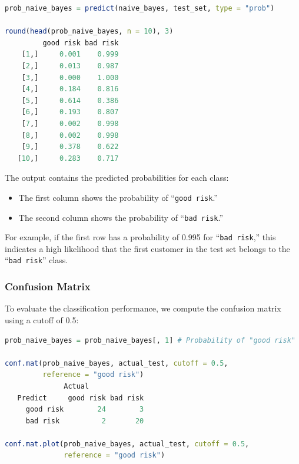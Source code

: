 \documentclass[
]{book}
\newcommand{\passthrough}[1]{#1}
\providecommand{\tightlist}{%
  \setlength{\itemsep}{0pt}\setlength{\parskip}{0pt}}
\theoremstyle{definition}
\theoremstyle{definition}
\theoremstyle{definition}
\theoremstyle{definition}
\theoremstyle{remark}
\begin{document}
\begin{lstlisting}[language=R]
prob_naive_bayes = predict(naive_bayes, test_set, type = "prob")

round(head(prob_naive_bayes, n = 10), 3)
         good risk bad risk
    [1,]     0.001    0.999
    [2,]     0.013    0.987
    [3,]     0.000    1.000
    [4,]     0.184    0.816
    [5,]     0.614    0.386
    [6,]     0.193    0.807
    [7,]     0.002    0.998
    [8,]     0.002    0.998
    [9,]     0.378    0.622
   [10,]     0.283    0.717
\end{lstlisting}

The output contains the predicted probabilities for each class:

\begin{itemize}
\tightlist
\item
  The first column shows the probability of ``\passthrough{\lstinline!good risk!}.''\\
\item
  The second column shows the probability of ``\passthrough{\lstinline!bad risk!}.''
\end{itemize}

For example, if the first row has a probability of 0.995 for ``\passthrough{\lstinline!bad risk!},'' this indicates a high likelihood that the first customer in the test set belongs to the ``\passthrough{\lstinline!bad risk!}'' class.

\subsubsection*{Confusion Matrix}\label{confusion-matrix-1}

To evaluate the classification performance, we compute the confusion matrix using a cutoff of 0.5:

\begin{lstlisting}[language=R]
prob_naive_bayes = prob_naive_bayes[, 1] # Probability of "good risk"

conf.mat(prob_naive_bayes, actual_test, cutoff = 0.5, 
         reference = "good risk")
              Actual
   Predict     good risk bad risk
     good risk        24        3
     bad risk          2       20

conf.mat.plot(prob_naive_bayes, actual_test, cutoff = 0.5, 
              reference = "good risk")
\end{lstlisting}
\end{document}
